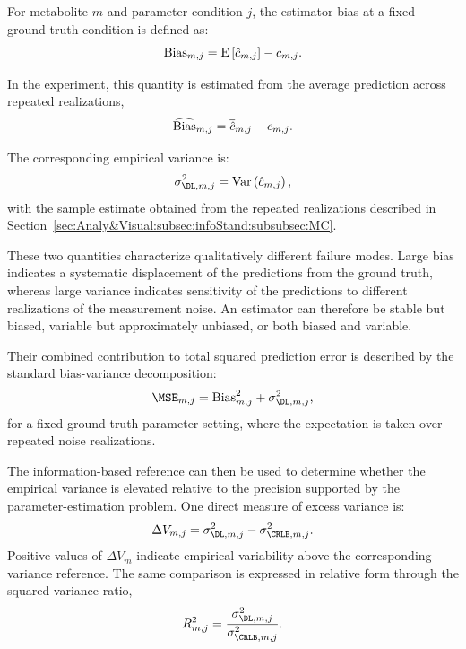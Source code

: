 For metabolite $m$ and parameter condition $j$, the estimator bias at a fixed ground-truth condition is defined as:
\begin{equation}
    \textnormal{Bias}_{m,j} = \textnormal{E}\left[\hat{c}_{m,j}\right] - c_{m,j}.
\end{equation}

In the \MC experiment, this quantity is estimated from the average prediction across repeated realizations,
\begin{equation}
        \widehat{\textnormal{Bias}}_{m,j} = \overline{\hat{c}}_{m,j} - c_{m,j}.
\end{equation}

The corresponding empirical \DL variance is:
\begin{equation}
    \sigma_{\DL,m,j}^{2} = \textnormal{Var}\left(\hat{c}_{m,j}\right),
\end{equation}
with the sample estimate obtained from the repeated realizations described in Section~\ref{sec:Analy&Visual:subsec:infoStand:subsubsec:MC}.

These two quantities characterize qualitatively different failure modes. Large bias indicates a systematic displacement of the predictions from the ground truth, whereas large variance indicates sensitivity of the predictions to different realizations of the measurement noise. An estimator can therefore be stable but biased, variable but approximately unbiased, or both biased and variable.

Their combined contribution to total squared prediction error is described by the standard bias-variance decomposition:
\begin{equation}
    \MSE_{m,j} = \textnormal{Bias}_{m,j}^{2} + \sigma_{\DL,m,j}^{2},
\end{equation}
for a fixed ground-truth parameter setting, where the expectation is taken over repeated noise realizations.

The information-based reference can then be used to determine whether the empirical variance is elevated relative to the precision supported by the parameter-estimation problem. One direct measure of excess variance is:
\begin{equation}
    \Delta V_{m,j} = \sigma_{\DL,m,j}^{2} - \sigma_{\CRLB,m,j}^{2}.
\end{equation}
Positive values of $\Delta V_m$ indicate empirical variability above the corresponding \CRLB variance reference. The same comparison is expressed in relative form through the squared variance ratio,
\begin{equation}
    R_{m,j}^{2} = \frac{\sigma_{\DL,m,j}^{2}}{\sigma_{\CRLB,m,j}^{2}}.
\end{equation}


